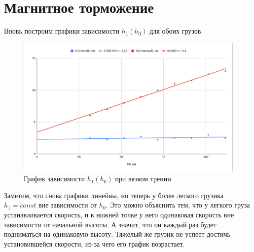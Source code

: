 \documentclass[12pt]{article}
\begin{document}
	\section{Магнитное торможение}
	Вновь построим графики зависимости $h_1(h_0)$ для обоих грузов
	\begin{figure}[H]
		\centering
		\includegraphics[width=\linewidth]{graph2}
		\caption{График зависимости $h_1(h_0)$ при вязком трении}
	\end{figure}
	Заметим, что снова графики линейны, но теперь у более легкого грузика $h_1=const$ вне зависимости от $h_0$. Это можно объяснить тем, что у легкого груза устанавливается скорость, и в нижней точке у него одинаковая скорость вне зависимости от начальной высоты. А значит, что он каждый раз будет подниматься на одинаковую высоту. Тяжелый же грузик не успеет достичь установившейся скорости, из-за чего его график возрастает.
\end{document}
